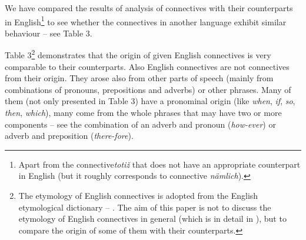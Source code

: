 \documentclass[output=paper]{langsci/langscibook.cls}
\begin{document}
We have compared the results of analysis of  connectives with their counterparts in English\footnote{ Apart from the  connective\textit{totiž} that does not have an appropriate counterpart in English (but it roughly corresponds to  connective \textit{nämlich}).} to see whether the connectives in another language exhibit similar behaviour – see Table 3.


Table 3\footnote{ The etymology of English connectives is adopted from the English etymological dictionary – \citet{harper2001online}. The aim of this paper is not to discuss the etymology of English connectives in general (which is in detail in \citet{lenker2007connectives}), but to compare the origin of some of them with their  counterparts. } demonstrates that the origin of given English connectives is very comparable to their  counterparts. Also English connectives are not connectives from their origin. They arose also from other parts of speech (mainly from combinations of pronouns, prepositions and adverbs) or other  phrases. Many of them (not only presented in Table 3) have a pronominal origin (like \textit{when},\textit{ if}, \textit{so}, \textit{then}, \textit{which}), many come from the whole phrases that may have two or more components – see the combination of an adverb and pronoun (\textit{how-ever}) or adverb and preposition (\textit{there-fore}). 
\end{document}
